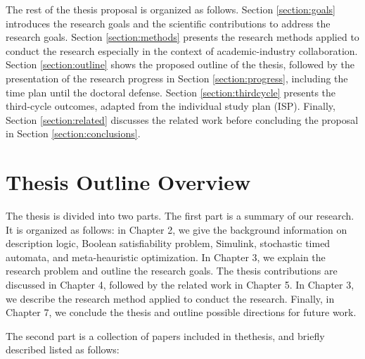 The rest of the thesis proposal is organized as follows. Section \ref{section:goals} introduces the research goals and the scientific contributions to address the research goals. Section \ref{section:methods} presents the research methods applied to conduct the research especially in the context of academic-industry collaboration. Section \ref{section:outline} shows the proposed outline of the thesis, followed by the presentation of the research progress in Section \ref{section:progress}, including the time plan until the doctoral defense. Section \ref{section:thirdcycle} presents the third-cycle outcomes, adapted from the individual study plan (ISP). Finally, Section \ref{section:related} discusses the related work before concluding the proposal in Section \ref{section:conclusions}.

\section{Thesis Outline Overview}
The thesis is divided into two parts. The first part is a summary of our research. It is organized as follows: in Chapter 2, we give the background information on description logic, Boolean satisfiability problem, Simulink, stochastic timed automata, and meta-heauristic optimization. In Chapter 3, we explain the research problem and outline the research goals. The thesis contributions are discussed in Chapter 4, followed by the related work in Chapter 5. In Chapter 3, we describe the research method applied to conduct the research. Finally, in Chapter 7, we conclude the thesis and outline possible directions for future work.

The second part is a collection of papers included in thethesis, and briefly described listed as follows: